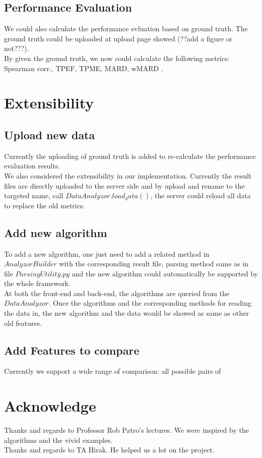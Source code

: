 \documentclass[11pt,letter]{article}
\begin{document}
\subsection {Performance Evaluation}
We could also calculate the performance evluation based on ground truth. The ground truth could be uploaded at upload page showed (??add a figure or not???). \\
By given the ground truth, we now could calculate the following metrics: Spearman corr., TPEF, TPME, MARD, wMARD \cite{rapmap}.


\section {Extensibility}
\subsection {Upload new data}
Currently the uploading of ground truth is added to re-calculate the performance evaluation results. \\
We also considered the extensibility in our implementation. Currently the result files are directly uploaded to the server side and by upload and rename to the targeted name, call $DataAnalyzor.load_data()$, the server could reload all data to replace the old metrics.
\subsection {Add new algorithm}
To add a new algorithm, one just need to add a related method in $AnalyzorBuilder$  with the corresponding result file, parsing method same as in file $ParsingUtility.py$ and the new algorithm could automatically be supported by the whole framework. \\
At both the front-end and back-end, the algorithms are queried from the $DataAnalyzor$. Once the algorithms and the corresponding methods for reading the data in, the new algorithm and the data would be showed as same as other old features.
\subsection {Add Features to compare}
Currently we support a wide range of comparison: all possible pairs of \\


\section{Acknowledge}
Thanks and regards to Professor Rob Patro's lectures. We were inspired by the algorithms and the vivid examples. \\
Thanks and regards to TA Hirak. He helped us a lot on the project.
\end{document}
